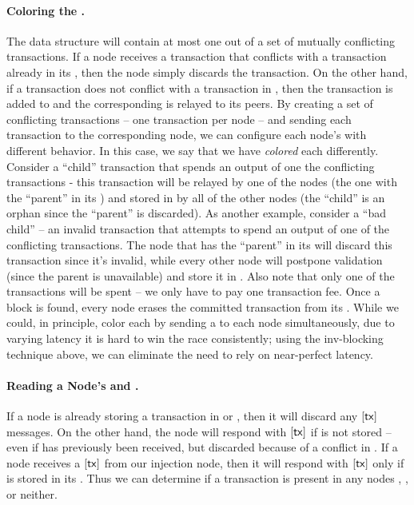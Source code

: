 \paragraph{Coloring the .}
The  data structure will contain at most one out of a set of mutually conflicting transactions.
If a node receives a transaction that conflicts with a transaction already in its , then the node simply discards the transaction. On the other hand, if a transaction does not conflict with a transaction in , then the transaction is added to  and the corresponding  is relayed to its peers. By creating a set of conflicting transactions -- one transaction per node -- and sending each transaction to the corresponding node, we can configure each node's  with different behavior. In this case, we say that we have \emph{colored} each  differently. Consider a ``child'' transaction that spends an output of one the conflicting transactions - this transaction will be relayed by one of the nodes (the one with the ``parent'' in its ) and stored in  by all of the other nodes (the ``child'' is an orphan since the ``parent'' is discarded). As another example, consider a ``bad child'' -- an invalid transaction that attempts to spend an output of one of the conflicting transactions. The node that has the ``parent'' in its  will discard this transaction since it's invalid, while every other node will postpone validation (since the parent is unavailable) and store it in . 
Also note that only one of the transactions will be spent -- we only have to pay one transaction fee. Once a block is found, every node erases the committed transaction from its . While we could, in principle, color each  by sending a \tx to each node simultaneously, due to varying latency it is hard to win the race consistently; using the inv-blocking technique above, we can eliminate the need to rely on near-perfect latency.

\paragraph{Reading a Node's  and .}
If a node is already storing a transaction \tx in  or , then it will discard any $[\textnormal{\textsf{tx}}]$ messages. On the other hand, the node will respond with $[\textnormal{\textsf{tx}}]$ if \tx is not stored -- even if \tx has previously been received, but discarded because of a conflict in . If a node receives a $[\textnormal{\textsf{tx}}]$ from our injection node, then it will respond with $[\textnormal{\textsf{tx}}]$ only if \tx is stored in its . Thus we can determine if a transaction is present in any nodes , , or neither.

